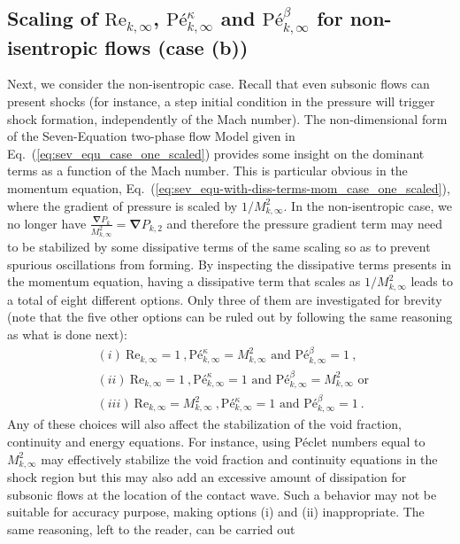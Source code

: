 \documentclass[preprint,10pt]{elsarticle}
\newcommand{\grad}{\mbold{\nabla}}
\newcommand{\mbold}[1]{\boldsymbol#1}
\renewcommand{\Re}{\textrm{Re}}
\newcommand{\Pe}{\textrm{P\'e}}
\newcommand{\eqt}[1]{Eq.~(\ref{#1})}                     %
\begin{document}
\subsection{Scaling of $\Re_{k,\infty}$, $\Pe_{k,\infty}^\kappa$ and $\Pe_{k,\infty}^\beta$ for non-isentropic flows (case (b))}\label{eq:non_isent_flows}
Next, we consider the non-isentropic case. Recall that even subsonic flows can present shocks (for instance, 
a step initial condition in the pressure will trigger shock formation, independently of the Mach number). 
The non-dimensional form of the Seven-Equation two-phase flow Model given in \eqt{eq:sev_equ_case_one_scaled} provides some insight on the 
dominant terms as a function of the Mach number. This is particular obvious in the momentum equation, \eqt{eq:sev_equ-with-diss-terms-mom_case_one_scaled}, 
where the gradient of pressure is scaled by $1/M_{k,\infty}^2$. In the non-isentropic case, we no longer 
have $\frac{\grad P_k}{M_{k,\infty}^2}=\grad P_{k,2}$ and therefore the pressure gradient term may need to be stabilized by 
some dissipative terms of the same scaling so as to prevent spurious oscillations from forming. 
By inspecting the dissipative terms presents in the momentum equation, having a dissipative term that 
scales as $1/M_{k,\infty}^2$ leads to a total of eight different options. Only three of them are investigated for brevity (note that the five other options can be ruled out by following the same reasoning as what is done next):
%
\begin{align}
&(i) \ \Re_{k,\infty} = 1 \ , \Pe_{k,\infty}^\kappa = M_{k,\infty}^2 \text{ and } \Pe_{k,\infty}^\beta = 1 \ , \nonumber \\
&(ii) \ \Re_{k,\infty} = 1 \ , \Pe_{k,\infty}^\kappa = 1 \text{ and } \Pe_{k,\infty}^\beta = M_{k,\infty}^2 \text{ or } \nonumber \\
&(iii) \ \Re_{k,\infty} = M_{k,\infty}^2 \ , \Pe_{k,\infty}^\kappa = 1 \text{ and } \Pe_{k,\infty}^\beta = 1 \ . \nonumber
\end{align}
%
Any of these choices will also affect the stabilization of the void fraction, continuity and energy equations. 
For instance, using P\'eclet numbers equal to $M_{k,\infty}^2$ may effectively stabilize the void fraction and continuity 
equations in the shock region but this may also add an excessive amount of dissipation for subsonic 
flows at the location of the contact wave. Such a behavior may not be suitable for accuracy purpose, 
making options (i) and (ii) inappropriate. The same reasoning, left to the reader, can be carried out 
\end{document}

